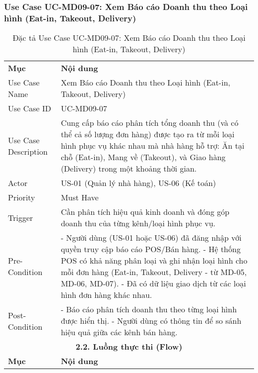 \subsubsection{Use Case UC-MD09-07: Xem Báo cáo Doanh thu theo Loại hình (Eat-in, Takeout, Delivery)}

\begin{longtable}{|m{4cm}|p{11cm}|}
\caption{Đặc tả Use Case UC-MD09-07: Xem Báo cáo Doanh thu theo Loại hình (Eat-in, Takeout, Delivery)} \label{tab:uc_md09_07} \\
\hline

\endhead %
\hline
\endfoot %
\hline
\endlastfoot %
\multicolumn{2}{|c|}{\textbf{2.1. Tóm tắt (Summary)}} \\
\hline
\textbf{Mục} & \textbf{Nội dung} \\
\hline
Use Case Name & Xem Báo cáo Doanh thu theo Loại hình (Eat-in, Takeout, Delivery) \\
\hline
Use Case ID & UC-MD09-07 \\
\hline
Use Case Description & Cung cấp báo cáo phân tích tổng doanh thu (và có thể cả số lượng đơn hàng) được tạo ra từ mỗi loại hình phục vụ khác nhau mà nhà hàng hỗ trợ: Ăn tại chỗ (Eat-in), Mang về (Takeout), và Giao hàng (Delivery) trong một khoảng thời gian. \\
\hline
Actor & US-01 (Quản lý nhà hàng), US-06 (Kế toán) \\
\hline
Priority & Must Have \\
\hline
Trigger & Cần phân tích hiệu quả kinh doanh và đóng góp doanh thu của từng kênh/loại hình phục vụ. \\
\hline
Pre-Condition & - Người dùng (US-01 hoặc US-06) đã đăng nhập với quyền truy cập báo cáo POS/Bán hàng. \newline - Hệ thống POS có khả năng phân loại và ghi nhận loại hình cho mỗi đơn hàng (Eat-in, Takeout, Delivery - từ MD-05, MD-06, MD-07). \newline - Đã có dữ liệu giao dịch từ các loại hình đơn hàng khác nhau. \\
\hline
Post-Condition & - Báo cáo phân tích doanh thu theo từng loại hình được hiển thị. \newline - Người dùng có thông tin để so sánh hiệu quả giữa các kênh bán hàng. \\
\hline
\multicolumn{2}{|c|}{\textbf{2.2. Luồng thực thi (Flow)}} \\
\hline
\textbf{Mục} & \textbf{Nội dung} \\

\end{longtable}
